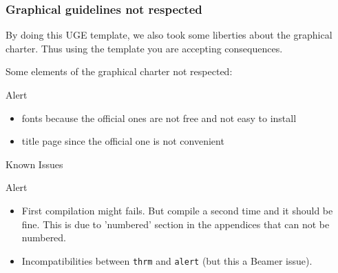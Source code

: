 	\begin{frame}
		\frametitle{Graphical guidelines not respected}

		By doing this UGE template, we also took some liberties about the graphical charter.
		Thus using the template you are accepting consequences.
		\bigskip
		
		Some elements of the graphical charter not respected:
		\begin{alertblock}{Alert}
			\begin{itemize}
			 	\item fonts because the official ones are not free and not easy to install
			 	\item title page since the official one is not convenient
			\end{itemize}
	   \end{alertblock}
	\end{frame}

	\begin{frame}[fragile]{Known Issues}
		\begin{alertblock}{Alert}
			\begin{itemize}
			 	\item First compilation might fails.
					But compile a second time and it should be fine.
				 	This is due to 'numbered' section in the appendices that 
					can not be numbered.
			 	\item Incompatibilities between \verb|thrm| and \verb|alert| (but this a Beamer issue).
			\end{itemize}
	   \end{alertblock}
	\end{frame}
